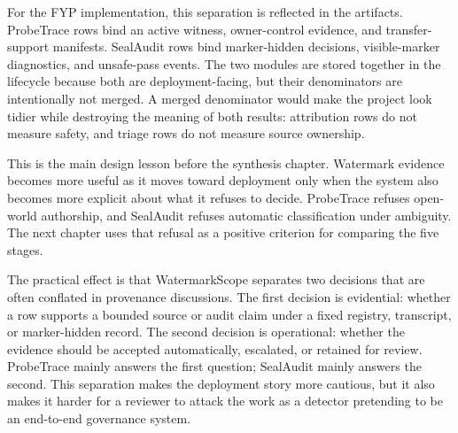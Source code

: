 For the FYP implementation, this separation is reflected in the artifacts. ProbeTrace rows bind an active witness, owner-control evidence, and transfer-support manifests. SealAudit rows bind marker-hidden decisions, visible-marker diagnostics, and unsafe-pass events. The two modules are stored together in the lifecycle because both are deployment-facing, but their denominators are intentionally not merged. A merged denominator would make the project look tidier while destroying the meaning of both results: attribution rows do not measure safety, and triage rows do not measure source ownership.

This is the main design lesson before the synthesis chapter. Watermark evidence becomes more useful as it moves toward deployment only when the system also becomes more explicit about what it refuses to decide. ProbeTrace refuses open-world authorship, and SealAudit refuses automatic classification under ambiguity. The next chapter uses that refusal as a positive criterion for comparing the five stages.

The practical effect is that WatermarkScope separates two decisions that are often conflated in provenance discussions. The first decision is evidential: whether a row supports a bounded source or audit claim under a fixed registry, transcript, or marker-hidden record. The second decision is operational: whether the evidence should be accepted automatically, escalated, or retained for review. ProbeTrace mainly answers the first question; SealAudit mainly answers the second. This separation makes the deployment story more cautious, but it also makes it harder for a reviewer to attack the work as a detector pretending to be an end-to-end governance system.
